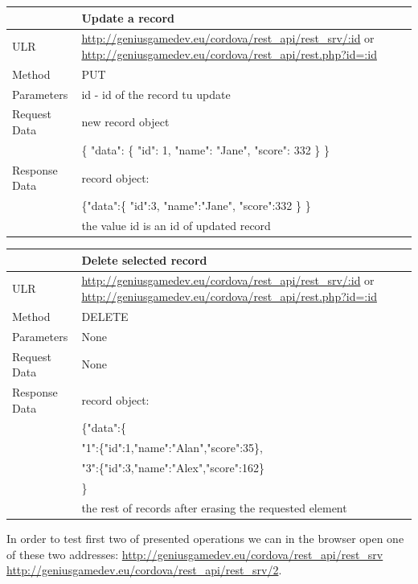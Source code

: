 \begin{tabularx}{\textwidth}{|l|X|}
\hline
&\textbf{Update a record}\\\hline
ULR &   \url{http://geniusgamedev.eu/cordova/rest_api/rest_srv/:id} or \url{http://geniusgamedev.eu/cordova/rest_api/rest.php?id=:id}\\\hline
Method  & PUT\\\hline
Parameters  & id - id of the record tu update \\\hline
Request Data & new record object\\
&\{
"data": \{
"id": 1,
"name": "Jane",
"score": 332
\}
\}
\\\hline
Response Data & record object:\\
&
\{"data":\{
    "id":3,
    "name":"Jane",
    "score":332
    \}
\}
\\
&the value id is an id of updated record
\\\hline
\end{tabularx}

\begin{tabularx}{\textwidth}{|l|X|}
\hline
&\textbf{Delete selected record}\\\hline
ULR &   \url{http://geniusgamedev.eu/cordova/rest_api/rest_srv/:id} or \url{http://geniusgamedev.eu/cordova/rest_api/rest.php?id=:id}\\\hline
Method  & DELETE\\\hline
Parameters  & None \\\hline
Request Data & None\\\hline
Response Data & record object:\\
&
\{"data":\{\\
&"1":\{"id":1,"name":"Alan","score":35\},\\
&"3":\{"id":3,"name":"Alex","score":162\}\\
&\}
\\
&the rest of records after erasing the requested element
\\\hline
\end{tabularx}


In order to test first two of presented operations we can in the browser open one of these two addresses: \url{http://geniusgamedev.eu/cordova/rest_api/rest_srv} \url{http://geniusgamedev.eu/cordova/rest_api/rest_srv/2}.


